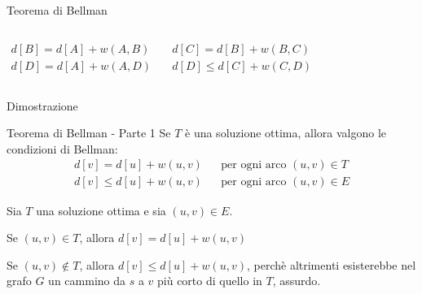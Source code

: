 \begin{frame}{Teorema di Bellman}
\begin{columns}[T]
\begin{center}
\begingroup
\tiny
\begin{align*}
d[B] = d[A] + w(A,B) &\quad
d[C] = d[B] + w(B,C)\\
d[D] = d[A] + w(A,D) &\quad
d[D] \leq d[C] + w(C,D)
\end{align*}
\endgroup
{}
\end{center}

\end{columns}


\end{frame}

\begin{frame}{Dimostrazione}

\begin{block}{Teorema di Bellman - Parte 1}
Se $T$ è una soluzione ottima, allora valgono le condizioni di Bellman:
\begin{align*} 
d[v] = d[u] + w(u,v) && \textrm{per ogni arco $(u,v) \in T$}\\
d[v] \leq d[u] + w(u,v) && \textrm{per ogni arco $(u,v) \in E$}
\end{align*}
\end{block}

\bigskip
Sia $T$ una soluzione ottima e sia $(u,v) \in E$.
\BIL
\item Se $(u,v) \in T$, allora $d[v] = d[u]+w(u,v)$
\item Se $(u,v) \notin T$, allora $d[v] \leq d[u] + w(u,v)$, perchè altrimenti
esisterebbe nel grafo $G$ un cammino da $s$ a $v$ più corto di quello in $T$, assurdo.
\EIL

\end{frame}

